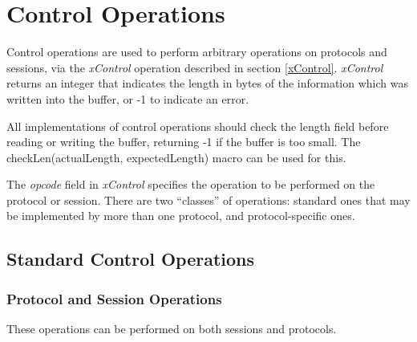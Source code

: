%
%

\section{ Control Operations }
\label{control}

Control operations are used to perform arbitrary operations on
protocols and sessions, via the {\em xControl} operation described in
section \ref{xControl}.  
{\em xControl} returns an integer that
indicates the length in bytes of the information which was written
into the buffer, or -1 to indicate an error.

All implementations of control operations should check the length
field before reading or writing the buffer, returning -1 if the buffer
is too small.  The {\sanss checkLen(actualLength, expectedLength)}
macro can be used for this.

The {\em opcode} field in {\em xControl} specifies the operation to be
performed on the protocol or session.
There are two ``classes'' of operations: standard ones that may be
implemented by more than one protocol, and protocol-specific ones.

\subsection{ Standard Control Operations }
\subsubsection{ Protocol and Session Operations }

These operations can be performed on both sessions and protocols.

